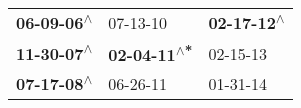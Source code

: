 \begin{supertabular}{lll}
 \textbf{06-09-06\textsuperscript{$\wedge$}} &                    07-13-10\textsuperscript{} &  \textbf{02-17-12\textsuperscript{$\wedge$}} \\
 \textbf{11-30-07\textsuperscript{$\wedge$}} &  \textbf{02-04-11\textsuperscript{$\wedge$*}} &                   02-15-13\textsuperscript{} \\
 \textbf{07-17-08\textsuperscript{$\wedge$}} &                    06-26-11\textsuperscript{} &                   01-31-14\textsuperscript{} \\
\end{supertabular}
